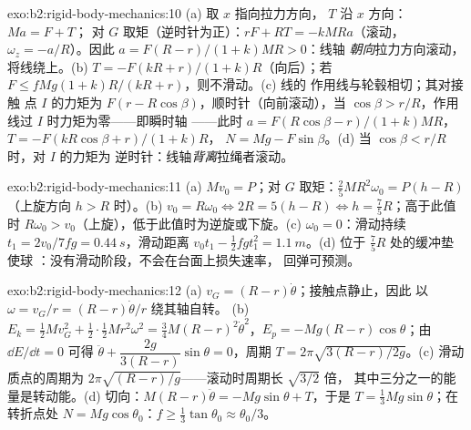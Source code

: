 \begin{solution}{exo:b2:rigid-body-mechanics:10}
(a) 取 $x$ 指向拉力方向， $T$ 沿 $x$ 方向：$Ma = F + T$；
对 $G$ 取矩（逆时针为正）：$rF + RT = -kMRa$（滚动，$\omega_z
= -a/R$）。因此 $a = F(R - r)/(1 + k)MR > 0$：线轴
\emph{朝向}拉力方向滚动，将线绕上。(b) $T = -F(kR + r)/(1 +
k)R$（向后）；若 $F \le fMg(1 + k)R/(kR + r)$，则不滑动。(c) 线的
作用线与轮毂相切；其对接触
点 $I$ 的力矩为 $F(r - R\cos\beta)$，顺时针（向前滚动），当 $\cos\beta >
r/R$，作用线过 $I$ 时力矩为零——即瞬时轴
——此时 $a = F(R\cos\beta - r)/(1 + k)MR$，$T = -F(kR\cos\beta + r)/(1 + k)R$，
$N = Mg - F\sin\beta$。(d) 当 $\cos\beta < r/R$ 时，对 $I$ 的力矩为
逆时针：线轴\emph{背离}拉绳者滚动。
\end{solution}

\begin{solution}{exo:b2:rigid-body-mechanics:11}
(a) $Mv_0 = P$；对 $G$ 取矩：$\tfrac25MR^2\omega_0 = P(h - R)$（上旋方向
$h > R$ 时）。(b) $v_0 = R\omega_0 \iff 2R = 5(h - R) \iff h = \tfrac75R$；高于此值时
$R\omega_0 > v_0$（上旋），低于此值时为逆旋或下旋。(c)
$\omega_0 = 0$：滑动持续 $t_1 = 2v_0/7fg = \qty{0.44}{s}$，滑动距离 $v_0t_1 -
\tfrac12fgt_1^2 = \qty{1.1}{m}$。(d) 位于 $\tfrac75R$ 处的缓冲垫使球
：没有滑动阶段，不会在台面上损失速率，
回弹可预测。
\end{solution}

\begin{solution}{exo:b2:rigid-body-mechanics:12}
(a) $v_G = (R - r)\dot\theta$；接触点静止，因此
以 $\omega = v_G/r = (R - r)\dot\theta/r$ 绕其轴自转。
(b) $E_k = \tfrac12Mv_G^2 + \tfrac12\cdot\tfrac12Mr^2\omega^2 = \tfrac34M(R - r)^2
\dot\theta^2$，$E_p = -Mg(R - r)\cos\theta$；由 $\dd E/\dd t = 0$ 可得 $\ddot\theta
+ \dfrac{2g}{3(R - r)}\sin\theta = 0$，周期 $T = 2\pi\sqrt{3(R - r)/2g}$。(c) 滑动
质点的周期为 $2\pi\sqrt{(R - r)/g}$——滚动时周期长 $\sqrt{3/2}$ 倍，
其中三分之一的能量是转动能。(d) 切向：$M(R - r)\ddot\theta =
-Mg\sin\theta + T$，于是 $T = \tfrac13Mg\sin\theta$；在转折点处
$N = Mg\cos\theta_0$：$f \ge \tfrac13\tan\theta_0 \approx \theta_0/3$。
\end{solution}

